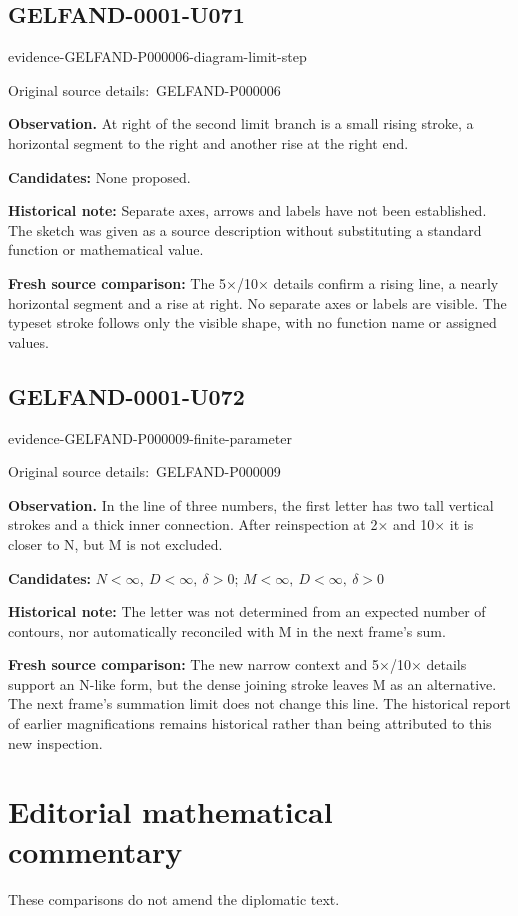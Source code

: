 \documentclass[11pt]{article}
\newcommand{\EvidenceBlock}[4]{%
 \par\smallskip\noindent\begin{minipage}{\linewidth}
 \begin{minipage}[t]{.47\linewidth}\vspace{0pt}\centering
 \csname evidence-#1-#2\endcsname\par
 {\scriptsize\SourceCropCaption\ #1}\par
 \end{minipage}\hfill
 \begin{minipage}[t]{.49\linewidth}\vspace{0pt}\raggedright
 {\small\color{orange!65!black}\textbf{#4} #3}\par
 \end{minipage}
 \end{minipage}\par\smallskip}
\newcommand{\SourceCropCaption}{Original source details:}\newcommand{\ReadingCaption}{Uncertain reading.}\newcommand{\IncompleteCaption}{Undeciphered passage.}\newcommand{\DiagramCaption}{Diagram and typed description.}
\begin{document}
\subsection*{GELFAND-0001-U071}
\EvidenceBlock{GELFAND-P000006}{diagram-limit-step}{At right of the second limit branch is a small rising stroke, a horizontal segment to the right and another rise at the right end.}{Observation.}
\par\smallskip\noindent\textbf{Candidates: } None proposed.\par
\par\smallskip\noindent\textbf{Historical note: } Separate axes, arrows and labels have not been established. The sketch was given as a source description without substituting a standard function or mathematical value.\par
\par\smallskip\noindent\textbf{Fresh source comparison: } The 5×/10× details confirm a rising line, a nearly horizontal segment and a rise at right. No separate axes or labels are visible. The typeset stroke follows only the visible shape, with no function name or assigned values.\par

\subsection*{GELFAND-0001-U072}
\EvidenceBlock{GELFAND-P000009}{finite-parameter}{In the line of three numbers, the first letter has two tall vertical strokes and a thick inner connection. After reinspection at 2× and 10× it is closer to N, but M is not excluded.}{Observation.}
\par\smallskip\noindent\textbf{Candidates: } \(N<\infty,\ D<\infty,\ \delta>0\); \(M<\infty,\ D<\infty,\ \delta>0\)\par
\par\smallskip\noindent\textbf{Historical note: } The letter was not determined from an expected number of contours, nor automatically reconciled with M in the next frame’s sum.\par
\par\smallskip\noindent\textbf{Fresh source comparison: } The new narrow context and 5×/10× details support an N-like form, but the dense joining stroke leaves M as an alternative. The next frame’s summation limit does not change this line. The historical report of earlier magnifications remains historical rather than being attributed to this new inspection.\par
\clearpage\section*{Editorial mathematical commentary}
These comparisons do not amend the diplomatic text.
\end{document}
